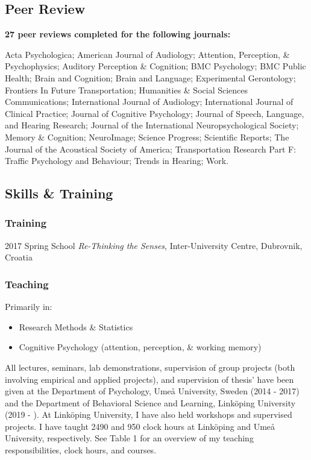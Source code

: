 \documentclass[]{article}
\providecommand{\tightlist}{%
  \setlength{\itemsep}{0pt}\setlength{\parskip}{0pt}}
\begin{document}
\subsection{Peer Review}\label{peer-review}

\textbf{27 peer reviews completed for the following journals:}

Acta Psychologica; American Journal of Audiology; Attention, Perception,
\& Psychophysics; Auditory Perception \& Cognition; BMC Psychology; BMC
Public Health; Brain and Cognition; Brain and Language; Experimental
Gerontology; Frontiers In Future Transportation; Humanities \& Social
Sciences Communications; International Journal of Audiology;
International Journal of Clinical Practice; Journal of Cognitive
Psychology; Journal of Speech, Language, and Hearing Research; Journal
of the International Neuropsychological Society; Memory \& Cognition;
NeuroImage; Science Progress; Scientific Reports; The Journal of the
Acoustical Society of America; Transportation Research Part F: Traffic
Psychology and Behaviour; Trends in Hearing; Work.

\subsection{Skills \& Training}\label{skills-training}

\subsubsection{Training}\label{training}

2017 Spring School \emph{Re-Thinking the Senses}, Inter-University
Centre, Dubrovnik, Croatia

\subsubsection{Teaching}\label{teaching}

Primarily in:

\begin{itemize}
\tightlist
\item
  Research Methods \& Statistics
\item
  Cognitive Psychology (attention, perception, \& working memory)
\end{itemize}

All lectures, seminars, lab demonstrations, supervision of group
projects (both involving empirical and applied projects), and
supervision of thesis' have been given at the Department of Psychology,
Umeå University, Sweden (2014 - 2017) and the Department of Behavioral
Science and Learning, Linköping University (2019 - ). At Linköping
University, I have also held workshops and supervised projects. I have
taught 2490 and 950 clock hours at Linköping and Umeå University,
respectively. See Table 1 for an overview of my teaching
responsibilities, clock hours, and courses.
\end{document}
